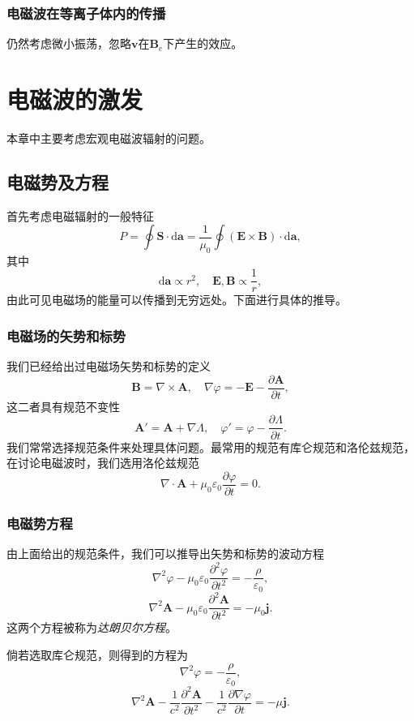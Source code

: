 \documentclass[UTF8]{ctexbook}
\renewcommand{\d}{\mathrm{d}}
\renewcommand{\b}{\boldsymbol}
\numberwithin{equation}{chapter}
\begin{document}
	\subsection{电磁波在等离子体内的传播}
	仍然考虑微小振荡，忽略$\b{v}$在$\b{B}_e$下产生的效应。
	
	\chapter{电磁波的激发}
	本章中主要考虑宏观电磁波辐射的问题。
	
	\section{电磁势及方程}
	首先考虑电磁辐射的一般特征
	\[P=\oint \b{S}\cdot\d\b{a}=\frac{1}{\mu_0}\oint(\b{E}\times\b{B})\cdot\d\b{a},\]
	其中
	\[\d\b{a}\propto r^2,\quad \b{E},\b{B}\propto\frac{1}{r},\]
	由此可见电磁场的能量可以传播到无穷远处。下面进行具体的推导。
	
	\subsection{电磁场的矢势和标势}
	我们已经给出过电磁场矢势和标势的定义
	\[\b{B}=\nabla\times\b{A},\quad \nabla\varphi=-\b{E}-\frac{\partial \b{A}}{\partial t},\]
	这二者具有规范不变性
	\[\b{A}'=\b{A}+\nabla\Lambda,\quad \varphi'=\varphi-\frac{\partial \Lambda}{\partial t}.\]
	我们常常选择规范条件来处理具体问题。最常用的规范有库仑规范和洛伦兹规范，在讨论电磁波时，我们选用洛伦兹规范
	\[\nabla\cdot\b{A}+\mu_0\varepsilon_0\frac{\partial \varphi}{\partial t}=0.\]
	
	\subsection{电磁势方程}
	由上面给出的规范条件，我们可以推导出矢势和标势的波动方程
	\[\nabla^2\varphi-\mu_0\varepsilon_0\frac{\partial^2\varphi}{\partial t^2}=-\frac{\rho}{\varepsilon_0},\]
	\[\nabla^2\b{A}-\mu_0\varepsilon_0\frac{\partial^2 \b{A}}{\partial t^2}=-\mu_0\b{j}.\]
	这两个方程被称为\emph{达朗贝尔方程}。
	
	倘若选取库仑规范，则得到的方程为
	\[\nabla^2\varphi=-\frac{\rho}{\varepsilon_0},\]
	\[\nabla^2\b{A}-\frac{1}{c^2}\frac{\partial^2\b{A}}{\partial t^2}-\frac{1}{c^2}\frac{\partial \nabla\varphi}{\partial t}=-\mu\b{j}.\]
	
\end{document}
